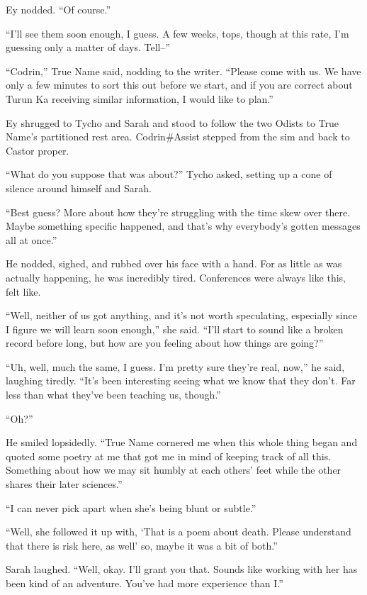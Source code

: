 Ey nodded. ``Of course.''

``I'll see them soon enough, I guess. A few weeks, tops, though at this rate, I'm guessing only a matter of days. Tell--''

``Codrin,'' True Name said, nodding to the writer. ``Please come with us. We have only a few minutes to sort this out before we start, and if you are correct about Turun Ka receiving similar information, I would like to plan.''

Ey shrugged to Tycho and Sarah and stood to follow the two Odists to True Name's partitioned rest area. Codrin\#Assist stepped from the sim and back to Castor proper.

``What do you suppose that was about?'' Tycho asked, setting up a cone of silence around himself and Sarah.

``Best guess? More about how they're struggling with the time skew over there. Maybe something specific happened, and that's why everybody's gotten messages all at once.''

He nodded, sighed, and rubbed over his face with a hand. For as little as was actually happening, he was incredibly tired. Conferences were always like this, felt like.

``Well, neither of us got anything, and it's not worth speculating, especially since I figure we will learn soon enough,'' she said. ``I'll start to sound like a broken record before long, but how are you feeling about how things are going?''

``Uh, well, much the same, I guess. I'm pretty sure they're real, now,'' he said, laughing tiredly. ``It's been interesting seeing what we know that they don't. Far less than what they've been teaching us, though.''

``Oh?''

He smiled lopsidedly. ``True Name cornered me when this whole thing began and quoted some poetry at me that got me in mind of keeping track of all this. Something about how we may sit humbly at each others' feet while the other shares their later sciences.''

``I can never pick apart when she's being blunt or subtle.''

``Well, she followed it up with, `That is a poem about death. Please understand that there is risk here, as well' so, maybe it was a bit of both.''

Sarah laughed. ``Well, okay. I'll grant you that. Sounds like working with her has been kind of an adventure. You've had more experience than I.''

